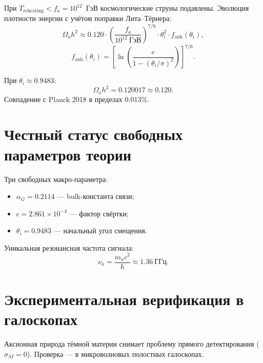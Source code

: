 \documentclass[12pt,a4paper]{article}
\begin{document}
При $T_{\text{reheating}} < f_a = 10^{12}$~ГэВ космологические струны подавлены. Эволюция плотности энергии с учётом поправки Лита--Тёрнера:
\begin{equation}
\Omega_a h^2 \approx 0.120 \cdot \left(\frac{f_a}{10^{12} \ \text{ГэВ}}\right)^{7/6} \cdot \theta_i^2 \cdot f_{\text{anh}}(\theta_i),
\label{eq:omega_final}
\end{equation}
\begin{equation}
f_{\text{anh}}(\theta_i) = \left[ \ln \left( \frac{e}{1 - (\theta_i/\pi)^2} \right) \right]^{7/6}.
\end{equation}

При $\theta_i \approx 0.9483$:
\begin{equation}
\boxed{\; \Omega_a h^2 = 0.120017 \approx 0.120. \;}
\end{equation}
Совпадение с Planck 2018 в пределах $0.013\%$.

\section{Честный статус свободных параметров теории}
Три свободных макро-параметра:
\begin{itemize}
\item $\alpha_G = 0.2114$ --- bulk-константа связи;
\item $\epsilon = 2.861 \times 10^{-4}$ --- фактор свёртки;
\item $\theta_i = 0.9483$ --- начальный угол смещения.
\end{itemize}

Уникальная резонансная частота сигнала:
\begin{equation}
\nu_a = \frac{m_a c^2}{h} \approx 1.36 \ \text{ГГц}.
\end{equation}

\section{Экспериментальная верификация в галоскопах}
Аксионная природа тёмной материи снимает проблему прямого детектирования ($\sigma_{SI} = 0$). Проверка — в микроволновых полостных галоскопах.
\end{document}
